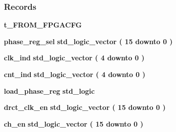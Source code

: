 \subsubsection*{Records}
 \begin{DoxyCompactItemize}
\item 
{\bf t\+\_\+\+F\+R\+O\+M\+\_\+\+F\+P\+G\+A\+C\+FG} {\bfseries  }
\item 
{\bf phase\+\_\+reg\+\_\+sel} {\bfseries {\bfseries \textcolor{comment}{std\+\_\+logic\+\_\+vector}\textcolor{vhdlchar}{ }\textcolor{vhdlchar}{(}\textcolor{vhdlchar}{ }\textcolor{vhdlchar}{ } \textcolor{vhdldigit}{15} \textcolor{vhdlchar}{ }\textcolor{keywordflow}{downto}\textcolor{vhdlchar}{ }\textcolor{vhdlchar}{ } \textcolor{vhdldigit}{0} \textcolor{vhdlchar}{ }\textcolor{vhdlchar}{)}\textcolor{vhdlchar}{ }}} 
\item 
{\bf clk\+\_\+ind} {\bfseries {\bfseries \textcolor{comment}{std\+\_\+logic\+\_\+vector}\textcolor{vhdlchar}{ }\textcolor{vhdlchar}{(}\textcolor{vhdlchar}{ }\textcolor{vhdlchar}{ } \textcolor{vhdldigit}{4} \textcolor{vhdlchar}{ }\textcolor{keywordflow}{downto}\textcolor{vhdlchar}{ }\textcolor{vhdlchar}{ } \textcolor{vhdldigit}{0} \textcolor{vhdlchar}{ }\textcolor{vhdlchar}{)}\textcolor{vhdlchar}{ }}} 
\item 
{\bf cnt\+\_\+ind} {\bfseries {\bfseries \textcolor{comment}{std\+\_\+logic\+\_\+vector}\textcolor{vhdlchar}{ }\textcolor{vhdlchar}{(}\textcolor{vhdlchar}{ }\textcolor{vhdlchar}{ } \textcolor{vhdldigit}{4} \textcolor{vhdlchar}{ }\textcolor{keywordflow}{downto}\textcolor{vhdlchar}{ }\textcolor{vhdlchar}{ } \textcolor{vhdldigit}{0} \textcolor{vhdlchar}{ }\textcolor{vhdlchar}{)}\textcolor{vhdlchar}{ }}} 
\item 
{\bf load\+\_\+phase\+\_\+reg} {\bfseries {\bfseries \textcolor{comment}{std\+\_\+logic}\textcolor{vhdlchar}{ }}} 
\item 
{\bf drct\+\_\+clk\+\_\+en} {\bfseries {\bfseries \textcolor{comment}{std\+\_\+logic\+\_\+vector}\textcolor{vhdlchar}{ }\textcolor{vhdlchar}{(}\textcolor{vhdlchar}{ }\textcolor{vhdlchar}{ } \textcolor{vhdldigit}{15} \textcolor{vhdlchar}{ }\textcolor{keywordflow}{downto}\textcolor{vhdlchar}{ }\textcolor{vhdlchar}{ } \textcolor{vhdldigit}{0} \textcolor{vhdlchar}{ }\textcolor{vhdlchar}{)}\textcolor{vhdlchar}{ }}} 
\item 
{\bf ch\+\_\+en} {\bfseries {\bfseries \textcolor{comment}{std\+\_\+logic\+\_\+vector}\textcolor{vhdlchar}{ }\textcolor{vhdlchar}{(}\textcolor{vhdlchar}{ }\textcolor{vhdlchar}{ } \textcolor{vhdldigit}{15} \textcolor{vhdlchar}{ }\textcolor{keywordflow}{downto}\textcolor{vhdlchar}{ }\textcolor{vhdlchar}{ } \textcolor{vhdldigit}{0} \textcolor{vhdlchar}{ }\textcolor{vhdlchar}{)}\textcolor{vhdlchar}{ }}} 

\end{DoxyCompactItemize}
